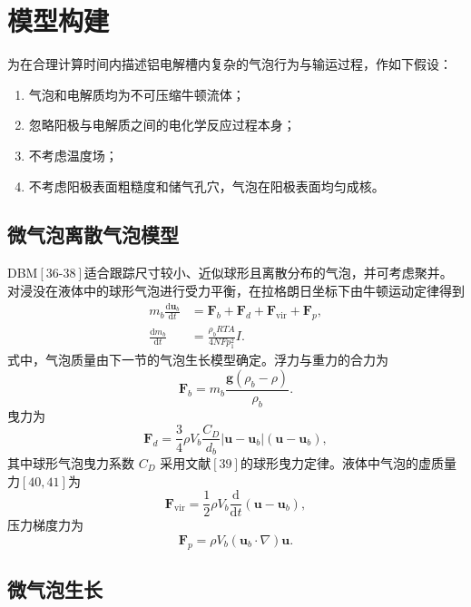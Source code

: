 \documentclass[UTF8,zihao=-4,fontset=fandol]{ctexart}
\newcommand{\vect}[1]{\bm{#1}}
\newcommand{\dd}{\mathrm{d}}
\begin{document}
\section{模型构建}

为在合理计算时间内描述铝电解槽内复杂的气泡行为与输运过程，作如下假设：
\begin{enumerate}[label=\arabic*.]
\item 气泡和电解质均为不可压缩牛顿流体；
\item 忽略阳极与电解质之间的电化学反应过程本身；
\item 不考虑温度场；
\item 不考虑阳极表面粗糙度和储气孔穴，气泡在阳极表面均匀成核。
\end{enumerate}

\subsection{微气泡离散气泡模型}

DBM\([36\text{-}38]\)适合跟踪尺寸较小、近似球形且离散分布的气泡，并可考虑聚并。对浸没在液体中的球形气泡进行受力平衡，在拉格朗日坐标下由牛顿运动定律得到
\begin{align}
m_b\frac{\dd\vect u_b}{\dd t}&=\vect F_b+\vect F_d+\vect F_{\mathrm{vir}}+\vect F_p, \tag{1}\\
\frac{\dd m_b}{\dd t}&=\frac{\rho_b RTA}{4NF p_1^2}I. \tag{2}
\end{align}
式中，气泡质量由下一节的气泡生长模型确定。浮力与重力的合力为
\begin{equation}
\vect F_b=m_b\frac{\vect g(\rho_b-\rho)}{\rho_b}. \tag{3}
\end{equation}
曳力为
\begin{equation}
\vect F_d=\frac{3}{4}\rho V_b\frac{C_D}{d_b}
\left|\vect u-\vect u_b\right|(\vect u-\vect u_b), \tag{4}
\end{equation}
其中球形气泡曳力系数 $C_D$ 采用文献\([39]\)的球形曳力定律。液体中气泡的虚质量力\([40,41]\)为
\begin{equation}
\vect F_{\mathrm{vir}}=\frac{1}{2}\rho V_b\frac{\dd}{\dd t}(\vect u-\vect u_b), \tag{5}
\end{equation}
压力梯度力为
\begin{equation}
\vect F_p=\rho V_b(\vect u_b\cdot\nabla)\vect u. \tag{6}
\end{equation}

\subsection{微气泡生长}
\end{document}
